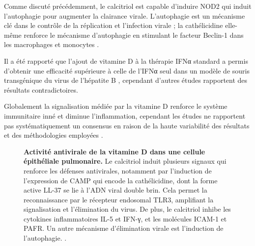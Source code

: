 \documentclass[
  a4paper,
  DIV=11,
  numbers=noendperiod,
  listof=totoc]{scrreprt}
\begin{document}
Comme discuté précédemment, le calcitriol est capable d'induire NOD2 qui
induit l'autophagie pour augmenter la clairance virale. L'autophagie est
un mécanisme clé dans le contrôle de la réplication et l'infection
virale ; la cathélicidine elle-même renforce le mécanisme d'autophagie
en stimulant le facteur Beclin-1 dans les macrophages et monocytes
\autocite{Bishop.2021}.

Il a été rapporté que l'ajout de vitamine D à la thérapie IFNα standard
a permis d'obtenir une efficacité supérieure à celle de l'IFNα seul dans
un modèle de souris transgénique du virus de l'hépatite B
\autocite{Lee.2020}, cependant d'autres études rapportent des résultats
contradictoires.

Globalement la signalisation médiée par la vitamine D renforce le
système immunitaire inné et diminue l'inflammation, cependant les études
ne rapportent pas systématiquement un consensus en raison de la haute
variabilité des résultats et des méthodologies employées
\autocite{Lee.2020}.

\begin{figure}


\caption[Activité antivirale de la vitamine D dans une cellule
épithéliale pulmonaire.]{\label{fig-vd-antiviral}\textbf{Activité
antivirale de la vitamine D dans une cellule épithéliale pulmonaire.} Le
calcitriol induit plusieurs signaux qui renforce les défenses
antivirales, notamment par l'induction de l'expression de CAMP qui
encode la cathélicidine, dont la forme active LL-37 se lie à l'ADN viral
double brin. Cela permet la reconnaissance par le récepteur endosomal
TLR3, amplifiant la signalisation et l'élimination du virus. De plus, le
calcitriol inhibe les cytokines inflammatoires IL-5 et IFN-γ, et les
molécules ICAM-1 et PAFR. Un autre mécanisme d'élimination virale est
l'induction de l'autophagie. \autocite{Ismailova.2022}.}

\end{figure}%
\end{document}
